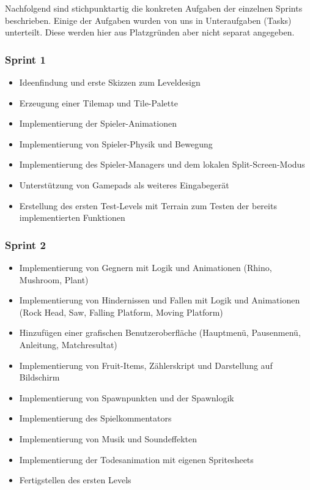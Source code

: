 Nachfolgend sind stichpunktartig die konkreten Aufgaben der einzelnen Sprints beschrieben. Einige der Aufgaben wurden von uns in Unteraufgaben (Tasks) unterteilt. Diese werden hier aus Platzgründen aber nicht separat angegeben.

\subsubsection*{Sprint 1}

\begin{itemize}
    \item Ideenfindung und erste Skizzen zum Leveldesign
    \item Erzeugung einer Tilemap und Tile-Palette
    \item Implementierung der Spieler-Animationen
    \item Implementierung von Spieler-Physik und Bewegung
    \item Implementierung des Spieler-Managers und dem lokalen Split-Screen-Modus
    \item Unterstützung von Gamepads als weiteres Eingabegerät
    \item Erstellung des ersten Test-Levels mit Terrain zum Testen der bereits implementierten Funktionen
\end{itemize}

\subsubsection*{Sprint 2}

\begin{itemize}
    \item Implementierung von Gegnern mit Logik und Animationen (Rhino, Mushroom, Plant)
    \item Implementierung von Hindernissen und Fallen mit Logik und Animationen (Rock Head, Saw, Falling Platform, Moving Platform)
    \item Hinzufügen einer grafischen Benutzeroberfläche (Hauptmenü, Pausenmenü, Anleitung, Matchresultat)
    \item Implementierung von Fruit-Items, Zählerskript und Darstellung auf Bildschirm
    \item Implementierung von Spawnpunkten und der Spawnlogik
    \item Implementierung des Spielkommentators
    \item Implementierung von Musik und Soundeffekten
    \item Implementierung der Todesanimation mit eigenen Spritesheets
    \item Fertigstellen des ersten Levels
    
\end{itemize}

